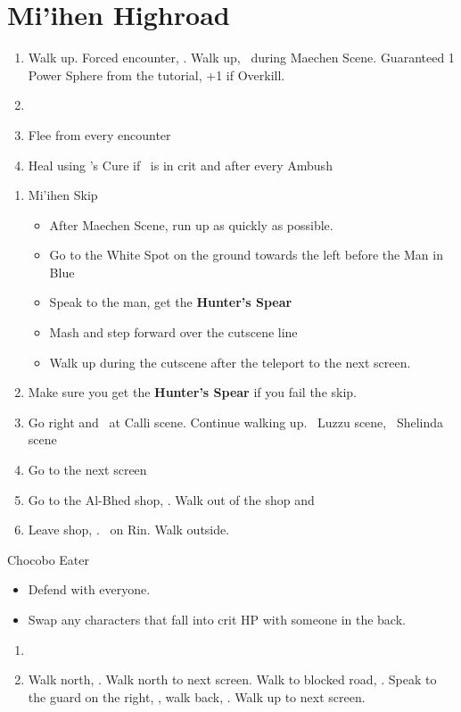 \chapter{Mi'ihen Highroad}

\begin{enumerate}
	\item Walk up. Forced encounter, \sd. Walk up, \sd\ during Maechen Scene. Guaranteed 1 Power Sphere from the tutorial, +1 if Overkill.
	\item \formation{\tidus}{\wakka}{\auron}
	\item Flee from every encounter
	\item Heal using \yuna's Cure if \tidus\ is in crit and after every Ambush
\end{enumerate}
\bothcb\wincb\losscb
\begin{enumerate}[resume]
	\item {Mi'ihen Skip}
		\begin{itemize}
			\item After Maechen Scene, run up as quickly as possible.
			\item Go to the White Spot on the ground towards the left before the Man in Blue
			\item Speak to the man, get the \textbf{Hunter's Spear}
			\item Mash and step forward over the cutscene line
			\item Walk up during the cutscene after the teleport to the next screen.
		\end{itemize}
	\item Make sure you get the \textbf{Hunter's Spear} if you fail the skip.
	\item Go right and \sd\ at Calli scene. Continue walking up. \sd\ Luzzu scene, \sd\ Shelinda scene
	\item Go to the next screen
	\item Go to the Al-Bhed shop, \sd. Walk out of the shop and \cs[5:30]
	\item Leave shop, \sd. \sd\ on Rin. Walk outside.
\end{enumerate}
\begin{battle}{Chocobo Eater}
	\begin{itemize}
		\tidusf Haste Boss
		\item Defend with everyone.
		\item Swap any characters that fall into crit HP with someone in the back.
	\end{itemize}
\end{battle}
\begin{enumerate}[resume]
	\item \sd
	\item Walk north, \save. Walk north to next screen. Walk to blocked road, \sd. Speak to the guard on the right, \sd, walk back, \sd. Walk up to next screen.
\end{enumerate}